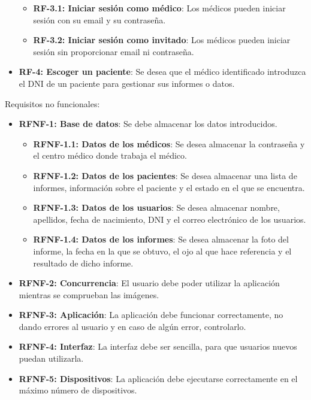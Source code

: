 \begin{itemize}
    \begin{itemize}
        \item \textbf{RF-3.1: Iniciar sesión como médico}: Los médicos pueden iniciar sesión con su email y su contraseña.
        \item \textbf{RF-3.2: Iniciar sesión como invitado}: Los médicos pueden iniciar sesión sin proporcionar email ni contraseña.
    \end{itemize}
    \item \textbf{RF-4: Escoger un paciente}: Se desea que el médico identificado introduzca el DNI de un paciente para gestionar sus informes o datos.
\end{itemize}

Requisitos no funcionales:

\begin{itemize}

    \item \textbf{RFNF-1: Base de datos}: Se debe almacenar los datos introducidos.
    \begin{itemize}
        \item \textbf{RFNF-1.1: Datos de los médicos}: Se desea almacenar la contraseña y el centro médico donde trabaja el médico.
        \item \textbf{RFNF-1.2: Datos de los pacientes}: Se desea almacenar una lista de informes, información sobre el paciente y el estado en el que se encuentra.
        \item \textbf{RFNF-1.3: Datos de los usuarios}: Se desea almacenar nombre, apellidos, fecha de nacimiento, DNI y el correo electrónico de los usuarios.
        \item \textbf{RFNF-1.4: Datos de los informes}: Se desea almacenar la foto del informe, la fecha en la que se obtuvo, el ojo al que hace referencia y el resultado de dicho informe. 
    \end{itemize}
    \item \textbf{RFNF-2: Concurrencia}: El usuario debe poder utilizar la aplicación mientras se comprueban las imágenes.
    \item \textbf{RFNF-3: Aplicación}: La aplicación debe funcionar correctamente, no dando errores al usuario y en caso de algún error, controlarlo.
    \item \textbf{RFNF-4: Interfaz}: La interfaz debe ser sencilla, para que usuarios nuevos puedan utilizarla.
    \item \textbf{RFNF-5: Dispositivos}: La aplicación debe ejecutarse correctamente en el máximo número de dispositivos.
\end{itemize}

